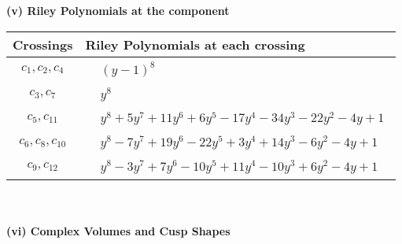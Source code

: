 \documentclass[1p]{elsarticle_modified}
\theoremstyle{definition}
\begin{document}
\newpage\renewcommand{\arraystretch}{1}
\flushleft \textbf{(v) Riley Polynomials at the component}\newline \\
\begin{tabular}{m{50pt}|m{274pt}}
Crossings & \hspace{64pt}Riley Polynomials at each crossing \\
\hline $$\begin{aligned}c_{1},c_{2},c_{4}\end{aligned}$$&$\begin{aligned}
&(y-1)^8
\end{aligned}$\\
\hline $$\begin{aligned}c_{3},c_{7}\end{aligned}$$&$\begin{aligned}
&y^8
\end{aligned}$\\
\hline $$\begin{aligned}c_{5},c_{11}\end{aligned}$$&$\begin{aligned}
&y^8+5 y^7+11 y^6+6 y^5-17 y^4-34 y^3-22 y^2-4 y+1
\end{aligned}$\\
\hline $$\begin{aligned}c_{6},c_{8},c_{10}\end{aligned}$$&$\begin{aligned}
&y^8-7 y^7+19 y^6-22 y^5+3 y^4+14 y^3-6 y^2-4 y+1
\end{aligned}$\\
\hline $$\begin{aligned}c_{9},c_{12}\end{aligned}$$&$\begin{aligned}
&y^8-3 y^7+7 y^6-10 y^5+11 y^4-10 y^3+6 y^2-4 y+1
\end{aligned}$\\
\hline
\end{tabular}\\~\\
\newpage\flushleft \textbf{(vi) Complex Volumes and Cusp Shapes}
\end{document}
